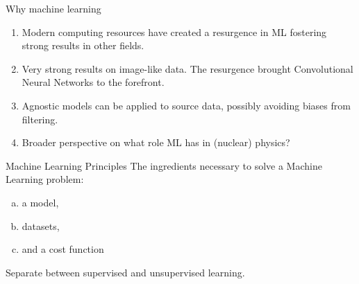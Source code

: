 \documentclass[notes]{beamer}
\begin{document}


\begin{frame}[t]{Why machine learning}
	\begin{enumerate}[I]
		\item Modern computing resources have created a resurgence in ML fostering strong results in other fields.
		\item Very strong results on image-like data. The resurgence brought Convolutional Neural Networks to the forefront.
		\item Agnostic models can be applied to source data, possibly avoiding biases from filtering.
		\item Broader perspective on what role ML has in (nuclear) physics?
	\end{enumerate}
\end{frame}

\begin{frame}[t]{Machine Learning Principles}
	The ingredients necessary to solve a Machine Learning problem: 
	\begin{enumerate}[(a)]
		\item a model,
		\item datasets,
		\item and a cost function
	\end{enumerate}

	Separate between supervised and unsupervised learning.
\end{frame}


%
%
%
%
\end{document}
